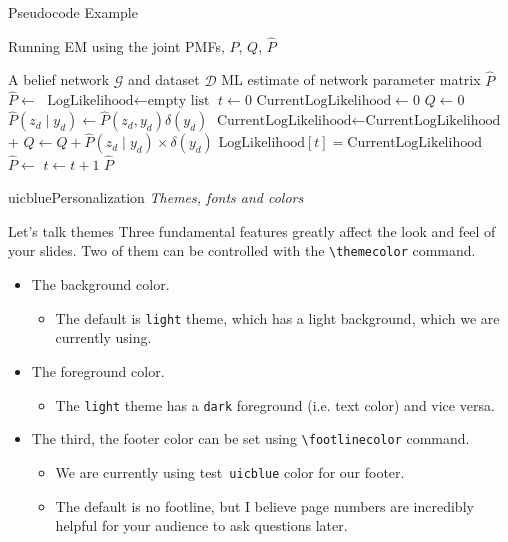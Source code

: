 \documentclass{beamer}
\newcommand{\testcolor}[1]{\colorbox{#1}{\textcolor{#1}{test}}~\texttt{#1}}
\begin{document}
\begin{frame}[fragile]{Pseudocode Example}
\begin{algorithm}[H]
\fontsize{8}{1}\selectfont
\caption{Running EM using the joint PMFs, $P$, $Q$, $\hat P$}
\begin{algorithmic}
\REQUIRE A belief network $\mathcal{G}$ and dataset $ \mathcal{D}$
\ENSURE ML estimate of network parameter matrix $\hat P$
\STATE $\hat P \gets$ 
\STATE $\text{LogLikelihood} \gets \text{empty list}$
\STATE $t \gets 0$
\REPEAT
    \STATE $\text{CurrentLogLikelihood} \gets 0$
    \STATE $Q \gets 0$
        \STATE $\hat P(z_d \mid y_d) \gets \hat P(z_d, y_d) \delta(y_d)$
        \STATE $\text{CurrentLogLikelihood} \gets \text{CurrentLogLikelihood}$ + 
        \STATE $Q \gets Q + \hat P(z_d \mid y_d) \times \delta(y_d)$ 
    \ENDFOR
    \STATE $\text{LogLikelihood}[t] = \text{CurrentLogLikelihood}$
    \STATE $\hat P \gets$  
    \STATE $t \gets t + 1$
\RETURN $\hat P$
\end{algorithmic}
\end{algorithm}
\end{frame}



\begin{chapter}{uicblue}{Personalization}
\textit{Themes, fonts and colors}
\end{chapter}


\begin{frame}[fragile]{Let's talk themes}
Three fundamental features greatly affect the look and feel of your slides. Two of them can be controlled with the \verb|\themecolor| command.
\begin{itemize}
\item The background color.
\begin{itemize}
    \item The default is \verb|light| theme, which has a light background, which we are currently using.
\end{itemize}
\item The foreground color.
\begin{itemize}
    \item The \verb|light| theme has a \verb|dark| foreground (i.e. text color) and vice versa.
\end{itemize}
\item The third, the footer color can be set using \verb|\footlinecolor| command.
\begin{itemize}
    \item We are currently using \testcolor{uicblue} color for our footer.
    \item The default is no footline, but I believe page numbers are incredibly helpful for your audience to ask questions later.
\end{itemize}
\end{itemize}
\end{frame}
\end{document}
